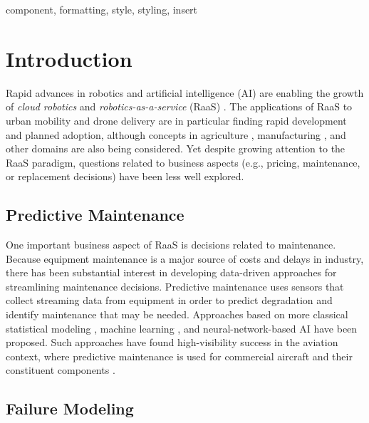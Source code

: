 \documentclass[conference]{IEEEtran}
\begin{document}
\begin{IEEEkeywords}
component, formatting, style, styling, insert
\end{IEEEkeywords}

\section{Introduction}

Rapid advances in robotics and artificial intelligence (AI) are enabling the growth of \emph{cloud robotics} and \emph{robotics-as-a-service} (RaaS) \cite{chen2010robot,hu2012cloud,kehoe2015survey,buerkle2023towards}. The applications of RaaS to urban mobility \cite{straubinger2020overview,cohen2021urban} and drone delivery \cite{dorling2016vehicle,scott2017drone} are in particular finding rapid development and planned adoption, although concepts in agriculture \cite{dharmasena2019autonomous,milella2024robot}, manufacturing \cite{yan2017cloud}, and other domains \cite{hu2012cloud,toscano2022integrating} are also being considered. Yet despite growing attention to the RaaS paradigm, questions related to business aspects (e.g.,  pricing, maintenance, or replacement decisions) have been less well explored.

\subsection{Predictive Maintenance}

One important business aspect of RaaS is decisions related to maintenance. Because equipment maintenance is a major source of costs and delays in industry, there has been substantial interest in developing data-driven approaches for streamlining maintenance decisions. Predictive maintenance \cite{zhang2019data,carvalho2019systematic,wang2024dynamic} uses sensors that collect streaming data from equipment in order to predict degradation and identify maintenance that may be needed. Approaches based on more classical statistical modeling \cite{zhang2019data}, machine learning \cite{carvalho2019systematic}, and neural-network-based AI \cite{wang2024dynamic} have been proposed. Such approaches have found high-visibility success in the aviation context, where predictive maintenance is used for commercial aircraft and their constituent components \cite{ge_maintenance_insight}.

\subsection{Failure Modeling}
\end{document}
